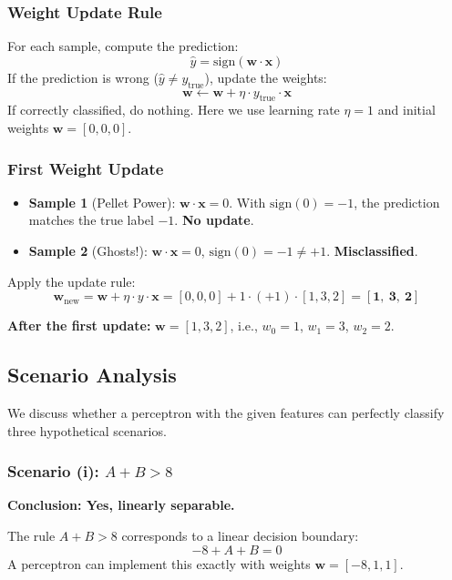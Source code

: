 \documentclass[a4paper,12pt]{article}
\begin{document}
\subsubsection{Weight Update Rule}

For each sample, compute the prediction:
\[
\hat{y} = \text{sign}(\mathbf{w} \cdot \mathbf{x})
\]
If the prediction is wrong ($\hat{y} \neq y_{\text{true}}$), update the weights:
\[
\mathbf{w} \leftarrow \mathbf{w} + \eta \cdot y_{\text{true}} \cdot \mathbf{x}
\]
If correctly classified, do nothing. Here we use learning rate $\eta = 1$ and initial weights $\mathbf{w} = [0, 0, 0]$.

\subsubsection{First Weight Update}

\begin{itemize}
    \item \textbf{Sample 1} (Pellet Power): $\mathbf{w} \cdot \mathbf{x} = 0$. With $\text{sign}(0) = -1$, the prediction matches the true label $-1$. \textbf{No update}.
    \item \textbf{Sample 2} (Ghosts!): $\mathbf{w} \cdot \mathbf{x} = 0$, $\text{sign}(0) = -1 \neq +1$. \textbf{Misclassified}.
\end{itemize}

Apply the update rule:
\[
\mathbf{w}_{\text{new}} = \mathbf{w} + \eta \cdot y \cdot \mathbf{x} = [0,0,0] + 1 \cdot (+1) \cdot [1, 3, 2] = \mathbf{[1,\ 3,\ 2]}
\]

\textbf{After the first update:} $\mathbf{w} = [1, 3, 2]$, i.e., $w_0 = 1$, $w_1 = 3$, $w_2 = 2$.

\subsection{Scenario Analysis}

We discuss whether a perceptron with the given features can perfectly classify three hypothetical scenarios.

\subsubsection{Scenario (i): $A + B > 8$}

\textbf{Conclusion: Yes, linearly separable.}

The rule $A + B > 8$ corresponds to a linear decision boundary:
\[
-8 + A + B = 0
\]
A perceptron can implement this exactly with weights $\mathbf{w} = [-8, 1, 1]$.
\end{document}
